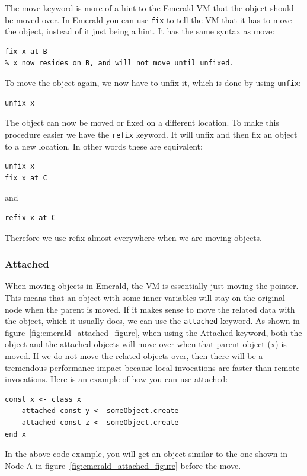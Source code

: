 The move keyword is more of a hint to the Emerald VM that the object should be moved over. In Emerald you can use \verb|fix| to tell the VM that it has to move the object, instead of it just being a hint. It has the same syntax as move:
\begin{lstlisting}[language=emerald]
% x is created and resides on A
fix x at B
% x now resides on B, and will not move until unfixed.
\end{lstlisting}
To move the object again, we now have to unfix it, which is done by using \verb|unfix|:
\begin{lstlisting}[language=emerald]
unfix x
\end{lstlisting}
The object can now be moved or fixed on a different location. To make this procedure easier we have the \verb|refix| keyword. It will unfix and then fix an object to a new location. In other words these are equivalent:
\begin{lstlisting}[language=emerald]
unfix x
fix x at C
\end{lstlisting}
and
\begin{lstlisting}[language=emerald]
refix x at C
\end{lstlisting}
Therefore we use refix almost everywhere when we are moving objects. 



\subsubsection{Attached}
When moving objects in Emerald, the VM is essentially just moving the pointer. This means that an object with some inner variables will stay on the original node when the parent is moved. If it makes sense to move the related data with the object, which it usually does, we can use the \verb|attached| keyword.
As shown in figure~\ref{fig:emerald_attached_figure}, when using the Attached keyword, both the object and the attached objects will move over when that parent object (x) is moved. If we do not move the related objects over, then there will be a tremendous performance impact because local invocations are faster than remote invocations. Here is an example of how you can use attached:
\begin{lstlisting}[language=emerald]
const x <- class x
    attached const y <- someObject.create
    attached const z <- someObject.create
end x
\end{lstlisting}
In the above code example, you will get an object similar to the one shown in Node A in figure~\ref{fig:emerald_attached_figure} before the move.

